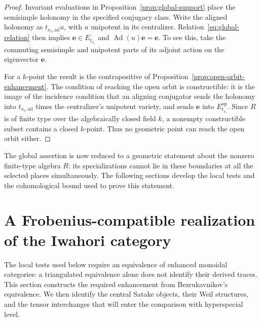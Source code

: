 \documentclass[11pt]{article}
\numberwithin{equation}{section}
\theoremstyle{definition}
\theoremstyle{remark}
\newcommand{\Ad}{\operatorname{Ad}}
\begin{document}
\begin{proof}
Invariant evaluations in Proposition~\ref{prop:global-support}
place the semisimple holonomy in the specified conjugacy class.
Write the aligned holonomy as $t_{x_i,\mathrm{ad}}u$, with $u$
unipotent in its centralizer.  Relation~\eqref{eq:global-relation}
then implies $\mathbf e\in E_{t_{x_i}}$ and $\Ad(u)\mathbf e
=\mathbf e$.  To see this, take the commuting semisimple and
unipotent parts of its adjoint action on the eigenvector
$\mathbf e$.

For a $k$-point the result is the contrapositive of
Proposition~\ref{prop:open-orbit-enhancement}.  The condition of
reaching the open orbit is constructible: it is the image of the
incidence condition that an aligning conjugator sends the holonomy
into $t_{x_i,\mathrm{ad}}$ times the centralizer's unipotent
variety, and sends $\mathbf e$ into $E_{t_{x_i}}^{\mathrm{op}}$.
Since $R$ is of finite type over the algebraically closed field $k$,
a nonempty constructible subset contains a closed $k$-point.
Thus no geometric point can reach the open orbit either.
\end{proof}

The global assertion is now reduced to a geometric statement about
the nonzero finite-type algebra $R$: its specializations cannot lie
in these boundaries at all the selected places simultaneously.
The following sections develop the local tests and the cohomological
bound used to prove this statement.


\section{A Frobenius-compatible realization of the Iwahori category}
\label{sec:enhancement}

The local tests used below require an equivalence of enhanced monoidal
categories: a triangulated equivalence alone does not identify their
derived traces.  This section constructs the required enhancement from
Bezrukavnikov's equivalence.  We then identify the central Satake objects,
their Weil structures, and the tensor interchanges that will enter the
comparison with hyperspecial level.
\end{document}
